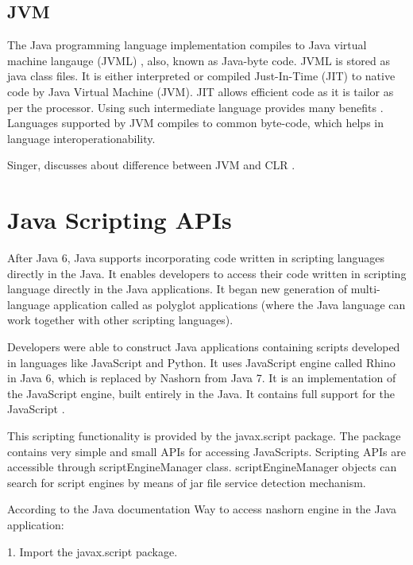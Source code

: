\subsection{JVM}

The Java programming language \cite{Gosling:1996:JLS:560667} implementation compiles to Java virtual machine langauge (JVML) \cite{Lindholm:2014:JVM:2636992},  also, known as Java-byte code. JVML is stored as java class files. It is either interpreted or compiled Just-In-Time (JIT) to native code by Java Virtual Machine (JVM). JIT allows efficient code as it is tailor as per the processor. Using such intermediate language provides many benefits \cite{clrspecification}. Languages supported by JVM compiles to common byte-code, which helps in language interoperationability.

Singer, discusses about difference between JVM and CLR \cite{Singer:2003:JVC:957289.957341}.

\section{Java Scripting APIs}

After Java 6, Java supports incorporating code written in scripting languages directly in the Java. It enables developers to access their code written in scripting language directly in the Java applications. It began new generation of multi-language application called as polyglot applications (where the Java language can work together with other scripting languages). \cite{Juneau2017}

Developers were able to construct Java applications containing scripts developed in languages like JavaScript and Python. It uses JavaScript engine called Rhino \cite{rhinojava} in Java 6, which is replaced by Nashorn \cite{nashornjava} from Java 7. It is an implementation of the JavaScript engine, built entirely in the Java. It contains full support for the JavaScript \cite{Juneau2017}.


This scripting functionality is provided by the javax.script package. The package contains very simple and small APIs for accessing JavaScripts. Scripting APIs are accessible through scriptEngineManager class. scriptEngineManager objects can search for script engines by means of jar file service detection mechanism.

According to the Java documentation \cite{javascripting} Way to access nashorn engine in the Java application:

1.	Import the javax.script package.


